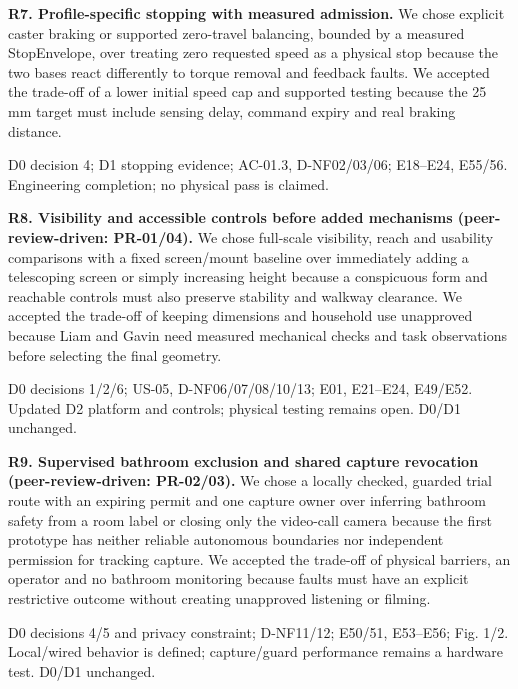 \documentclass[12pt,letterpaper]{article}
\begin{document}
\begin{minipage}{\linewidth}
\textbf{R7. Profile-specific stopping with measured admission.} We chose explicit caster braking or supported zero-travel balancing, bounded by a measured StopEnvelope, over treating zero requested speed as a physical stop because the two bases react differently to torque removal and feedback faults. We accepted the trade-off of a lower initial speed cap and supported testing because the 25 mm target must include sensing delay, command expiry and real braking distance.

{\small D0 decision 4; D1 stopping evidence; AC-01.3, D-NF02/03/06; E18--E24, E55/56. Engineering completion; no physical pass is claimed.\par}
\end{minipage}\par\medskip

\begin{minipage}{\linewidth}
\textbf{R8. Visibility and accessible controls before added mechanisms (peer-review-driven: PR-01/04).} We chose full-scale visibility, reach and usability comparisons with a fixed screen/mount baseline over immediately adding a telescoping screen or simply increasing height because a conspicuous form and reachable controls must also preserve stability and walkway clearance. We accepted the trade-off of keeping dimensions and household use unapproved because Liam and Gavin need measured mechanical checks and task observations before selecting the final geometry.

{\small D0 decisions 1/2/6; US-05, D-NF06/07/08/10/13; E01, E21--E24, E49/E52. Updated D2 platform and controls; physical testing remains open. D0/D1 unchanged.\par}
\end{minipage}\par\medskip

\begin{minipage}{\linewidth}
\textbf{R9. Supervised bathroom exclusion and shared capture revocation (peer-review-driven: PR-02/03).} We chose a locally checked, guarded trial route with an expiring permit and one capture owner over inferring bathroom safety from a room label or closing only the video-call camera because the first prototype has neither reliable autonomous boundaries nor independent permission for tracking capture. We accepted the trade-off of physical barriers, an operator and no bathroom monitoring because faults must have an explicit restrictive outcome without creating unapproved listening or filming.

{\small D0 decisions 4/5 and privacy constraint; D-NF11/12; E50/51, E53--E56; Fig. 1/2. Local/wired behavior is defined; capture/guard performance remains a hardware test. D0/D1 unchanged.\par}
\end{minipage}\par\medskip
\end{document}
